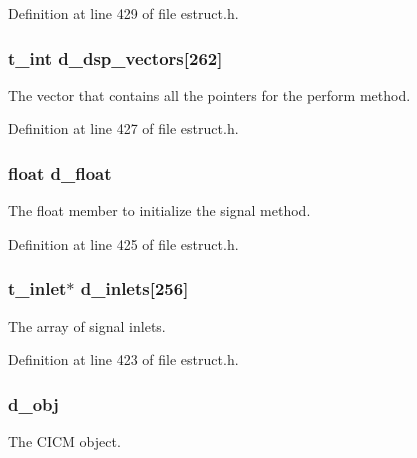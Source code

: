 Definition at line 429 of file estruct.\-h.

\hypertarget{struct__edspobj_a6c9361ef0820022b61cd7894d641c029}{
\subsubsection[{d\-\_\-dsp\-\_\-vectors}]{\setlength{\rightskip}{0pt plus 5cm}t\-\_\-int d\-\_\-dsp\-\_\-vectors\mbox{[}262\mbox{]}}}\label{struct__edspobj_a6c9361ef0820022b61cd7894d641c029}
The vector that contains all the pointers for the perform method. 

Definition at line 427 of file estruct.\-h.

\hypertarget{struct__edspobj_aaa8c8ad1277112523fd01b5058e0fcb5}{
\subsubsection[{d\-\_\-float}]{\setlength{\rightskip}{0pt plus 5cm}float d\-\_\-float}}\label{struct__edspobj_aaa8c8ad1277112523fd01b5058e0fcb5}
The float member to initialize the signal method. 

Definition at line 425 of file estruct.\-h.

\hypertarget{struct__edspobj_af58ea0594fc028861443f36dc2d1ebf4}{
\subsubsection[{d\-\_\-inlets}]{\setlength{\rightskip}{0pt plus 5cm}t\-\_\-inlet$\ast$ d\-\_\-inlets\mbox{[}256\mbox{]}}}\label{struct__edspobj_af58ea0594fc028861443f36dc2d1ebf4}
The array of signal inlets. 

Definition at line 423 of file estruct.\-h.

\hypertarget{struct__edspobj_a987087c8b9df0fa2ae99bd44ab53dab9}{
\subsubsection[{d\-\_\-obj}]{ d\-\_\-obj}}\label{struct__edspobj_a987087c8b9df0fa2ae99bd44ab53dab9}
The C\-I\-C\-M object. 


